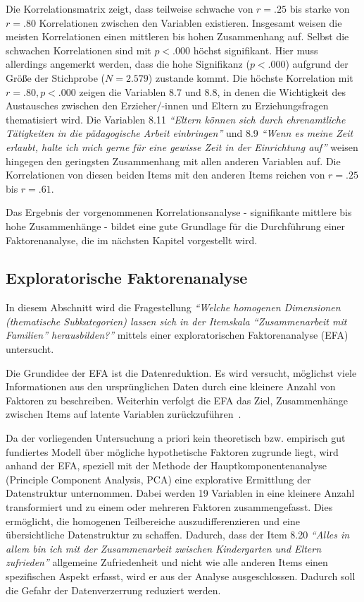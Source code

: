 \documentclass[12pt,a4paper]{article}
\begin{document}
	Die Korrelationsmatrix zeigt, dass teilweise schwache von $r = .25$ bis starke von $r = .80$ Korrelationen zwischen den Variablen existieren. Insgesamt weisen die meisten Korrelationen einen mittleren bis hohen Zusammenhang auf. Selbst die schwachen Korrelationen sind mit $p < .000$ höchst signifikant. Hier muss allerdings angemerkt werden, dass die hohe Signifikanz ($p < .000$) aufgrund der Größe der Stichprobe ($N= 2.579$) zustande kommt. Die höchste Korrelation mit $r = .80, p < .000$ zeigen die Variablen 8.7 und 8.8, in denen die Wichtigkeit des Austausches zwischen den Erzieher/-innen und Eltern zu Erziehungsfragen thematisiert wird. Die Variablen 8.11 \textit{"`Eltern können sich durch ehrenamtliche Tätigkeiten in die pädagogische Arbeit einbringen"'} und 8.9 \textit{"`Wenn es meine Zeit erlaubt, halte ich mich gerne für eine gewisse Zeit in der Einrichtung auf"'} weisen hingegen den geringsten Zusammenhang mit allen anderen Variablen auf. Die Korrelationen von diesen beiden Items mit den anderen Items reichen von $r = .25$ bis $r = .61$.
	
	Das Ergebnis der vorgenommenen Korrelationsanalyse - signifikante mittlere bis hohe Zusammenhänge - bildet eine gute Grundlage für die Durchführung einer Faktorenanalyse, die im nächsten Kapitel vorgestellt wird.

\subsection{Exploratorische Faktorenanalyse} 
In diesem Abschnitt wird die Fragestellung \textit{"`Welche homogenen Dimensionen  (thematische Subkategorien) lassen sich in der Itemskala "`Zusammenarbeit mit Familien"' herausbilden?"'} mittels einer exploratorischen Faktorenanalyse (EFA) untersucht.

	Die Grundidee der EFA ist die Datenreduktion. Es wird versucht, möglichst viele Informationen aus den ursprünglichen Daten durch eine kleinere Anzahl von Faktoren zu beschreiben. Weiterhin verfolgt die EFA das Ziel, Zusammenhänge zwischen Items auf latente Variablen zurückzuführen~\parencite[S.~180]{Buehner}.
	
	Da der vorliegenden Untersuchung a priori kein theoretisch bzw. empirisch gut fundiertes Modell über mögliche hypothetische Faktoren zugrunde liegt, wird anhand der EFA, speziell mit der Methode der Hauptkomponentenanalyse (Principle Component Analysis, PCA) eine explorative Ermittlung der Datenstruktur unternommen. Dabei werden 19 Variablen in eine kleinere Anzahl transformiert und zu einem oder mehreren Faktoren zusammengefasst. Dies ermöglicht, die homogenen Teilbereiche auszudifferenzieren und eine übersichtliche Datenstruktur zu schaffen. Dadurch, dass der Item 8.20 \textit{"`Alles in allem bin ich mit der Zusammenarbeit zwischen Kindergarten und Eltern zufrieden"'} allgemeine Zufriedenheit und nicht wie alle anderen Items einen spezifischen Aspekt erfasst, wird er aus der Analyse ausgeschlossen. Dadurch soll die Gefahr der Datenverzerrung reduziert werden.
\end{document}
